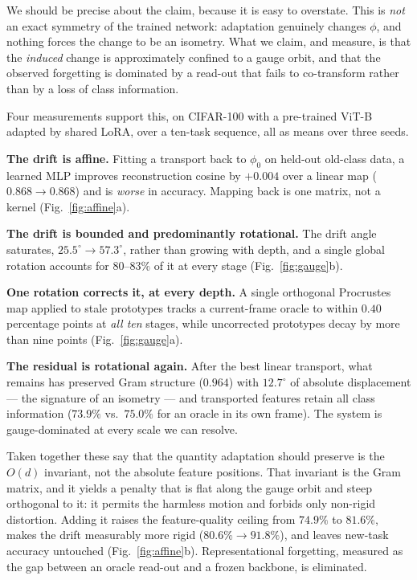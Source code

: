 We should be precise about the claim, because it is easy to overstate. This is
\emph{not} an exact symmetry of the trained network: adaptation genuinely changes
$\phi$, and nothing forces the change to be an isometry. What we claim, and
measure, is that the \emph{induced} change is approximately confined to a gauge
orbit, and that the observed forgetting is dominated by a read-out that fails to
co-transform rather than by a loss of class information.

Four measurements support this, on CIFAR-100 with a pre-trained ViT-B adapted by
shared LoRA, over a ten-task sequence, all as means over three seeds.

\textbf{The drift is affine.} Fitting a transport back to $\phi_0$ on held-out
old-class data, a learned MLP improves reconstruction cosine by $+0.004$ over a
linear map ($0.868 \to 0.868$) and is \emph{worse} in accuracy. Mapping back is
one matrix, not a kernel (Fig.~\ref{fig:affine}a).

\textbf{The drift is bounded and predominantly rotational.} The drift angle
saturates, $25.5^\circ \to 57.3^\circ$, rather than growing with depth, and a
single global rotation accounts for $80$--$83\%$ of it at every stage
(Fig.~\ref{fig:gauge}b).

\textbf{One rotation corrects it, at every depth.} A single orthogonal Procrustes
map applied to stale prototypes tracks a current-frame oracle to within
$0.40$ percentage points at \emph{all ten} stages, while uncorrected prototypes
decay by more than nine points (Fig.~\ref{fig:gauge}a).

\textbf{The residual is rotational again.} After the best linear transport, what
remains has preserved Gram structure ($0.964$) with $12.7^\circ$ of absolute
displacement --- the signature of an isometry --- and transported features retain
all class information ($73.9\%$ vs.\ $75.0\%$ for an oracle in its own frame).
The system is gauge-dominated at every scale we can resolve.

Taken together these say that the quantity adaptation should preserve is the
$O(d)$ invariant, not the absolute feature positions. That invariant is the Gram
matrix, and it yields a penalty that is flat along the gauge orbit and steep
orthogonal to it: it permits the harmless motion and forbids only non-rigid
distortion. Adding it raises the feature-quality ceiling from $74.9\%$ to
$81.6\%$, makes the drift measurably more rigid ($80.6\% \to 91.8\%$), and leaves
new-task accuracy untouched (Fig.~\ref{fig:affine}b). Representational forgetting,
measured as the gap between an oracle read-out and a frozen backbone, is
eliminated.

